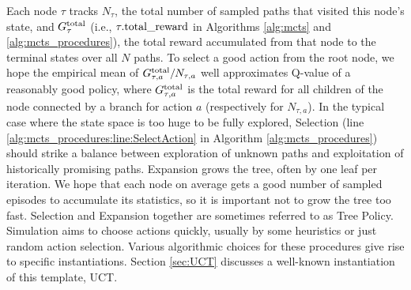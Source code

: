 Each node $\tau$ tracks $N_\tau$, the total number of sampled paths that visited this node's state, and $G^{\rm total}_\tau$ (i.e., $\tau.{\rm total\_reward}$ in Algorithms \ref{alg:mcts} and \ref{alg:mcts_procedures}), the total reward accumulated from that node to the terminal states over all $N$ paths. To select a good action from the root node, we hope the empirical mean of $G^{\rm total}_{\tau,a}/N_{\tau,a}$ well approximates Q-value of a reasonably good policy, where $G^{\rm total}_{\tau,a}$ is the total reward for all children of the node connected by a branch for action $a$ (respectively for $N_{\tau,a}$).
In the typical case where the state space is too huge to be fully explored, Selection (line \ref{alg:mcts_procedures:line:SelectAction} in Algorithm \ref{alg:mcts_procedures}) should strike a balance between exploration of unknown paths and exploitation of historically promising paths.
Expansion grows the tree, often by one leaf per iteration. We hope that each node on average gets a good number of sampled episodes to accumulate its statistics, so it is important not to grow the tree too fast.
Selection and Expansion together are sometimes referred to as Tree Policy.
Simulation aims to choose actions quickly, usually by some heuristics or just random action selection.
Various algorithmic choices for these procedures give rise to specific instantiations.
Section \ref{sec:UCT} discusses a well-known instantiation of this template, UCT.

